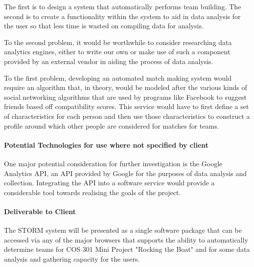 \documentclass[12pt]{article}
\begin{document}
The first is to design a system that automatically performs team building. The second is to create a functionality within the system to aid in data analysis for the user so that less time is wasted on compiling data for analysis.

To the second problem, it would be worthwhile to consider researching data analytics engines, either to write our own or make use of such a component provided by an external vendor in aiding the process of data analysis.

To the first problem, developing an automated match making system would require an algorithm that, in theory, would be modeled after the various kinds of social networking algorithms that are used by programs like Facebook to suggest friends based off compatibility scores. This service would have to first define a set of characteristics for each person and then use those characteristics to construct a profile around which other people are considered for matches for teams.
\paragraph{Potential Technologies for use where not specified by client}
One major potential consideration for further investigation is the Google Analytics API, an API provided by Google for the purposes of data analysis and collection. Integrating the API into a software service would provide a considerable tool towards realising the goals of the project.
\paragraph{Deliverable to Client}
The STORM system will be presented as a single software package that can be accessed via any of the major browsers that supports the ability to automatically determine teams for COS 301 Mini Project "Rocking the Boat" and for some data analysis and gathering capacity for the users.
\end{document}

